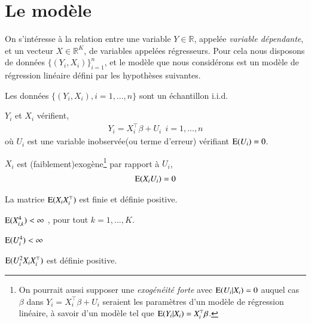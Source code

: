 \documentclass[10pt, reqno]{amsart}
\begin{document}
\section{Le modèle}
On s'intéresse à la relation entre une variable $Y\in \mathbb{R}$, appelée \emph{variable dépendante}, et un vecteur $X\in \mathbb{R}^K$, de variables appelées  régresseurs. Pour cela nous disposons de données $\{(Y_i, X_i)\}_{i=1}^n$, et le modèle que nous considérons est un modèle de régression linéaire défini par les hypothèses suivantes.
\begin{condition}
Les données  $\{(Y_i, X_i), i = 1,...,n\}$ sont un échantillon i.i.d.
\label{cond1}
\end{condition}
\begin{condition} $Y_i$  et $X_i$ vérifient,
\begin{align*} 
Y_i= X_i^\top\beta + U_i \ \ i = 1,...,n
\end{align*}
où $U_i$ est une variable inobservée(ou terme d'erreur) vérifiant $\operatorname{E}(U_i) = 0$.
\label{cond2} 
\end{condition}
\begin{condition}$X_i$ est (faiblement)exogène\footnote{On pourrait aussi supposer une \emph{exogénéité forte} avec $\operatorname{E}(U_i|X_i) = 0$
    auquel cas $\beta$ dans $Y_i = X_i^\top\beta + U_i$ seraient les paramètres d'un modèle de régression linéaire, à savoir d'un modèle tel 
    que $\operatorname{E}(Y_i|X_i) = X_i^\top \beta $.} par rapport à $U_i$,
\begin{align*}
\operatorname{E}(X_iU_i) = 0
\end{align*}
\label{cond3} 
\end{condition}
\begin{condition} 
La matrice $\operatorname{E}(X_iX_i^\top)$ est finie et définie positive.
\label{cond4}
\end{condition}
\begin{condition}
$\operatorname{E}(X_{i,k}^4) < \infty$ , pour tout $k=1,...,K$.
\label{cond5}
\end{condition}
\begin{condition}
$\operatorname{E}(U_i^4) < \infty$
\label{cond6}
\end{condition}
\begin{condition}
$\operatorname{E}(U_i^2X_iX_i^\top)$ est définie positive.
\label{cond7}
\end{condition}
\end{document}
